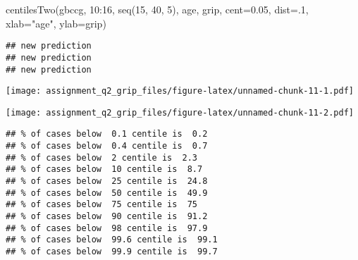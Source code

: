 \documentclass[
]{article}
\newenvironment{Shaded}{\begin{snugshade}}{\end{snugshade}}
\newcommand{\AttributeTok}[1]{\textcolor[rgb]{0.77,0.63,0.00}{#1}}
\newcommand{\ConstantTok}[1]{\textcolor[rgb]{0.00,0.00,0.00}{#1}}
\newcommand{\DecValTok}[1]{\textcolor[rgb]{0.00,0.00,0.81}{#1}}
\newcommand{\FloatTok}[1]{\textcolor[rgb]{0.00,0.00,0.81}{#1}}
\newcommand{\FunctionTok}[1]{\textcolor[rgb]{0.00,0.00,0.00}{#1}}
\newcommand{\NormalTok}[1]{#1}
\newcommand{\SpecialCharTok}[1]{\textcolor[rgb]{0.00,0.00,0.00}{#1}}
\newcommand{\StringTok}[1]{\textcolor[rgb]{0.31,0.60,0.02}{#1}}
\begin{document}
\begin{Shaded}
\begin{Highlighting}[]
\FunctionTok{centilesTwo}\NormalTok{(gbccg, }\DecValTok{10}\SpecialCharTok{:}\DecValTok{16}\NormalTok{, }\FunctionTok{seq}\NormalTok{(}\DecValTok{15}\NormalTok{, }\DecValTok{40}\NormalTok{, }\DecValTok{5}\NormalTok{), age,  grip, }\AttributeTok{cent=}\FloatTok{0.05}\NormalTok{, }\AttributeTok{dist=}\NormalTok{.}\DecValTok{1}\NormalTok{, }\AttributeTok{xlab=}\StringTok{"age"}\NormalTok{, }\AttributeTok{ylab=}\StringTok{\textquotesingle{}grip\textquotesingle{}}\NormalTok{)}
\end{Highlighting}
\end{Shaded}

\begin{verbatim}
## new prediction 
## new prediction 
## new prediction
\end{verbatim}

\texttt{[image: assignment\_q2\_grip\_files/figure-latex/unnamed-chunk-11-1.pdf]}

\begin{Shaded}
\end{Shaded}

\texttt{[image: assignment\_q2\_grip\_files/figure-latex/unnamed-chunk-11-2.pdf]}

\begin{verbatim}
## % of cases below  0.1 centile is  0.2 
## % of cases below  0.4 centile is  0.7 
## % of cases below  2 centile is  2.3 
## % of cases below  10 centile is  8.7 
## % of cases below  25 centile is  24.8 
## % of cases below  50 centile is  49.9 
## % of cases below  75 centile is  75 
## % of cases below  90 centile is  91.2 
## % of cases below  98 centile is  97.9 
## % of cases below  99.6 centile is  99.1 
## % of cases below  99.9 centile is  99.7
\end{verbatim}
\end{document}

